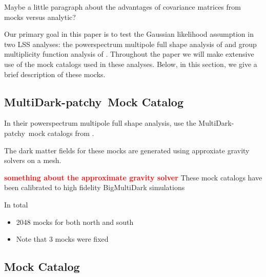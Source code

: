 \documentclass[12pt, letterpaper, preprint]{aastex}
\newcommand{\bitem}{\begin{itemize}}
\newcommand{\eitem}{\end{itemize}}
\newcommand{\todo}[1]{{\bf \textcolor{red}{#1}}}
\newcommand{\patchy}{{\fontshape\scdefault\selectfont patchy}}
\begin{document}
Maybe a little paragraph about the advantages of covariance matrices from 
mocks versus analytic? 

Our primary goal in this paper is to test the Gaussian likelihood assumption 
in two LSS analyses: the powerspectrum multipole full shape analysis of \cite{beutler2017} 
and group multiplicity function analysis of \cite{sinha2017}. Throughout
the paper we will make extensive use of the mock catalogs used in these 
analyses. Below, in this section, we give a brief description of these mocks. 

\subsection{MultiDark-\patchy~Mock Catalog} 
In their powerspectrum multipole full shape analysis, \cite{beutler2017}
use the MultiDark-\patchy~mock catalogs from \cite{kitaura2016}. 


The dark matter fields for these mocks are generated using approxiate
gravity solvers on a mesh. 


\todo{something about the approximate gravity solver} 
These mock catalogs have been calibrated to high fidelity BigMultiDark 
simulations~\citep{rodriguez-torres2016, klypin2016}

In total \cite{beutler2017} 



\bitem
    \item 2048 mocks for both north and south 
    \item Note that 3 mocks were fixed
\eitem

\subsection{\cite{sinha2017} Mock Catalog}
\end{document}
